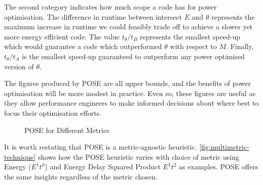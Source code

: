 The second category indicates how much scope a code has for power optimisation.
The difference in runtime between intersect $E$ and $\theta$ represents the maximum increase in runtime we could feasibly trade off to achieve a slower yet more energy efficient code.
The value $t_\theta / t_B$ represents the smallest speed-up which would guarantee a code which outperformed $\theta$ with respect to $M$.
Finally, $t_\theta / t_A$ is the smallest speed-up guaranteed to outperform any power optimised version of $\theta$.

The figures produced by POSE are all upper bounds, and the benefits of power optimisation will be more modest in practice.
Even so, these figures are useful as they allow performance engineers to make informed decisions about where best to focus their optimisation efforts.

\begin{figure}
\centering

\caption{POSE for Different Metrics}
\label{fig:multimetric-technique}
\end{figure}

It is worth restating that POSE is a metric-agnostic heuristic. \autoref{fig:multimetric-technique} shows how the POSE heuristic varies with choice of metric using Energy ($E^1t^0$) and Energy Delay Squared Product $E^1t^2$ as examples. POSE offers the same insights regardless of the metric chosen.

